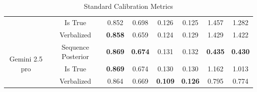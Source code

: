 \begin{table}[h]
{\begin{tabular}{cc|cccccc}
 & Is True & 0.852 & 0.698 & 0.126 & 0.125 & 1.457 & 1.282 \\
 & Verbalized & \textbf{0.858} & 0.659 & 0.124 & 0.129 & 1.429 & 1.422 \\
\hline
\multirow{3}{*}{Gemini 2.5 pro} & Sequence Posterior & \textbf{0.869} & \textbf{0.674} & 0.131 & 0.132 & \textbf{0.435} & \textbf{0.430} \\
 & Is True & \textbf{0.869} & 0.674 & 0.130 & 0.130 & 1.162 & 1.013 \\
 & Verbalized & 0.864 & 0.669 & \textbf{0.109} & \textbf{0.126} & 0.795 & 0.774 \\
\hline
\bottomrule
\end{tabular}
}
\caption{Standard Calibration Metrics}
\label{tab:standard}
\end{table}